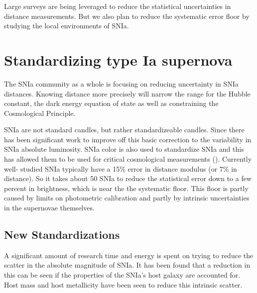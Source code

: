 \documentclass[apj, iop]{emulateapj}
\newcommand{\sn}{SNIa}
\begin{document}

Large surveys are being leveraged to reduce the statistical uncertainties
in distance measurements. But we also plan to reduce the systematic error floor
by studying the local environments of \sn{}.

\section{Standardizing type Ia
supernova}\label{standardizing-type-ia-supernova}

The \sn{} community as a whole is focusing on reducing uncertainty in \sn{}
distances. Knowing distance more precisely will narrow the range for the Hubble
constant, the dark energy equation of state as well as constraining the
Cosmological Principle.

\sn{} are not standard candles, but rather standardizeable candles. Since
\cite{Phillips93} there has been significant work to improve off this basic
correction to the variability in \sn{} absolute luminosity. \sn{} color is also
used to standardize \sn{} and this has allowed them to be used for critical
cosmological measurements (\citep{Riess98, Perlmutter99}). Currently well-
studied \sn{} typically have a 15\% error in distance modulus (or 7\% in
distance). So it takes about 50 \sn{} to reduce the statistical error down to a
few percent in brightness, which is near the the systematic floor. This floor
is partly caused by limits on photometric calibration and partly by intrinsic
uncertainties in the supernovae themselves.

\subsection{New Standardizations}\label{new-standardizations}

A significant amount of research time and energy is spent on trying to reduce
the scatter in the absolute magnitude of \sn{}. It has been found that a
reduction in this can be seen if the properties of the \sn{}'s host galaxy are
accounted for. Host mass \citep{Childress13} and host metallicity
\citep{Hayden13} have been seen to reduce this intrinsic scatter.
\end{document}

